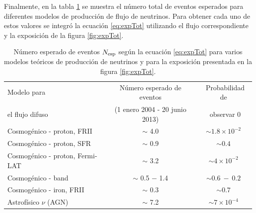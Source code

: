  	Finalmente, en la tabla \ref{tab:rates} se muestra el n\'umero total de eventos esperados para diferentes modelos de producci\'on de flujo de neutrinos.
 	Para obtener cada uno de estos valores se integr\'o la ecuaci\'on \ref{eq:expTot} utilizando el flujo correspondiente y la exposici\'on de la figura \ref{fig:expTot}.
	\begin{table}[!t]
	\begin{center}
	\renewcommand{\arraystretch}{1.3}
	\footnotesize
	\begin{tabular}{l c c} 
	\hline
	Modelo para       &  Número esperado de eventos     & ~Probabilidad de   \\
	el flujo difuso   &  (1 enero 2004 - 20 junio 2013) & ~observar $0$   \\
	\hline
	Cosmogénico - proton, FRII \cite{Kampert_GZK}     &  $\sim$ 4.0  & $\sim 1.8\times 10^{-2}$ \\

	Cosmogénico - proton, SFR \cite{Kampert_GZK}      &  $\sim$ 0.9  & $\sim 0.4$               \\

	Cosmogénico - proton, Fermi-LAT \cite{Ahlers_GZK} &  $\sim$ 3.2  & $\sim 4\times 10^{-2}$   \\

	Cosmogénico - band \cite{Kotera_GZK}              &  $\sim$ 0.5 $-$ 1.4 & $\sim 0.6~-~0.2$ \\

	Cosmogénico - iron, FRII \cite{Kampert_GZK}       &  $\sim$ 0.3  & $\sim 0.7$ \\

	\hline

	Astrofísico $\nu$ (AGN) \cite{Becker_AGN}     &  $\sim$ 7.2  & $\sim 7\times 10^{-4}$ \\

% 

	\hline
	\end{tabular}
	\end{center}
	\vskip -3mm
	\caption{\label{tab:rates}
	Número esperado de eventos $N_{\rm esp}$ según la ecuación \ref{eq:expTot} para varios modelos teóricos de producción de neutrinos y para la exposición presentada en la figura \ref{fig:expTot}.
	}
	\end{table}
	
